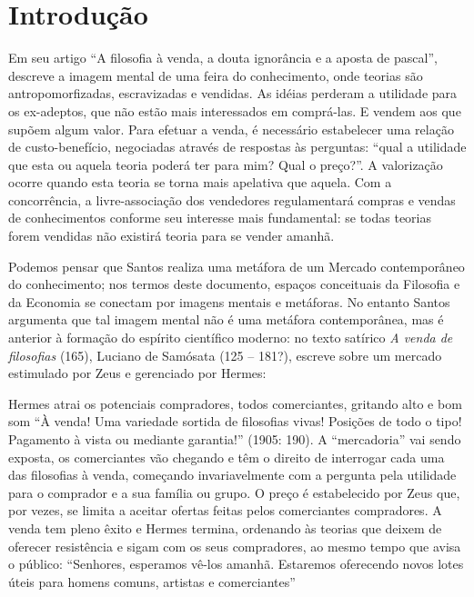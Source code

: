 \chapter*{Introdução} 

Em seu artigo ``A filosofia à venda, a douta ignorância e a aposta de pascal'',  descreve a imagem mental de uma feira do conhecimento, onde teorias  são antropomorfizadas, escravizadas e vendidas. As idéias perderam a utilidade para os ex-adeptos, que não estão mais interessados em comprá-las. E vendem aos que supõem algum valor. Para efetuar a venda, é necessário estabelecer uma relação de custo-benefício, negociadas através de respostas às perguntas: ``qual a utilidade que esta ou aquela teoria poderá ter para mim? Qual o preço?''. A valorização ocorre quando esta teoria se torna mais apelativa que aquela. Com a concorrência, a livre-associação dos vendedores regulamentará compras e vendas de conhecimentos conforme seu interesse mais fundamental: se todas teorias forem vendidas não existirá teoria para se vender amanhã. 

Podemos pensar que Santos realiza uma  metáfora de um Mercado contemporâneo do conhecimento; nos termos deste documento, espaços conceituais da Filosofia e da Economia se conectam por imagens mentais e metáforas. No entanto Santos argumenta que tal imagem mental não é uma metáfora contemporânea, mas é anterior à formação do espírito científico moderno: no texto satírico \emph{A venda de filosofias} (165), Luciano de Samósata (125 -- 181?), escreve sobre um mercado estimulado por Zeus e gerenciado por Hermes:

\begin{citacao}
Hermes atrai os potenciais compradores, todos comerciantes, gritando alto e bom som “À venda! Uma variedade sortida de filosofias vivas! Posições de todo o tipo! Pagamento à vista ou mediante garantia!” (1905: 190). A “mercadoria” vai sendo exposta, os comerciantes vão chegando e têm o direito de interrogar cada uma das filosofias à venda, começando invariavelmente com a pergunta pela utilidade para o comprador e a sua família ou grupo. O preço é estabelecido por Zeus que, por vezes, se limita a aceitar ofertas feitas pelos comerciantes compradores. A venda tem pleno êxito e Hermes termina, ordenando às teorias que deixem de oferecer resistência e sigam com os seus compradores, ao mesmo tempo que avisa o público: “Senhores, esperamos vê-los amanhã. Estaremos oferecendo novos lotes úteis para homens comuns, artistas e comerciantes”   
\end{citacao}

